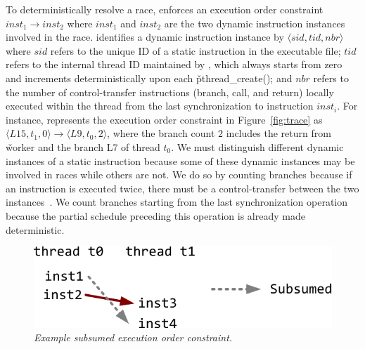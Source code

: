 To deterministically resolve a race, \peregrine enforces an execution order
constraint $inst_1 \rightarrow inst_2$ where $inst_1$ and $inst_2$ are the
two dynamic instruction instances involved in the race.  \peregrine identifies a
dynamic instruction instance by $\langle sid, tid, nbr \rangle$ where
$sid$ refers to the unique ID of a static instruction in the executable
file; $tid$ refers to the internal thread ID maintained by \peregrine, which
always starts from zero and increments deterministically upon each
\v{pthread\_create()}; and $nbr$ refers to the number of control-transfer
instructions (branch, call, and return) locally executed within the thread
from the last synchronization to instruction $inst_i$.  For instance, \peregrine
represents the execution order constraint in
Figure~\ref{fig:trace} as $\langle L15,t_1,0\rangle \rightarrow
\langle L9,t_0,2 \rangle$, where the branch count $2$ includes the return
from \v{worker} and the branch L7 of thread $t_0$.
We must distinguish different dynamic instances of a static instruction
because some of these dynamic instances may be involved in races while others
are not.  We do so by counting branches because if an instruction is
executed twice, there must be a control-transfer between
the two instances~\cite{smp-revirt:vee08}.  We count branches starting from the last
synchronization operation because the partial schedule preceding this
operation is already made deterministic.



\begin{figure}[t]
\centering
\includegraphics[width=.65\columnwidth]{peregrine/figures/pruned-order}
\caption{{\em Example subsumed execution order
    constraint.}} \label{fig:subsumed}
\end{figure}

